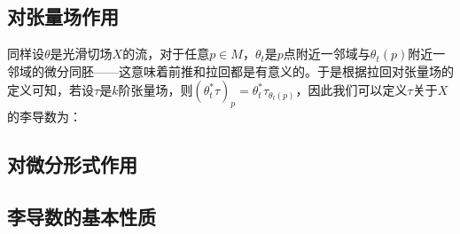 \subsection{对张量场作用}
同样设$\theta$是光滑切场$X$的流，对于任意$p\in M$，$\theta_t$是$p$点附近一邻域与$\theta_t(p)$附近一邻域的微分同胚——这意味着前推和拉回都是有意义的。于是根据拉回对张量场的定义可知，若设$\tau$是$k$阶张量场，则$(\theta_t^*\tau)_p=\theta_t^*\tau_{\theta_t(p)}$，因此我们可以定义$\tau$关于$X$的李导数为：



\subsection{对微分形式作用}
\subsection{李导数的基本性质}